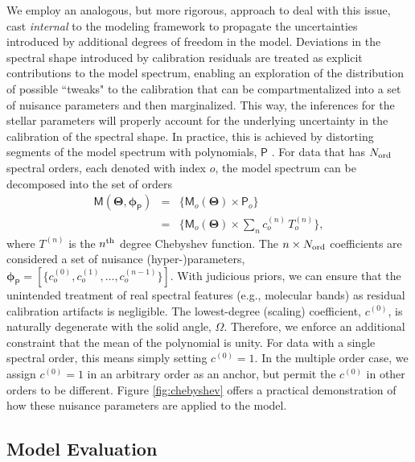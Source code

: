 \documentclass[iop,floatfix,twocolappendix]{emulateapj}
\newcommand{\vM}{\mathsf{M}}
\newcommand{\vT}{ {\bm \Theta}}
\newcommand{\vp}{ {\bm \phi}}
\newcommand{\cheb}{ \vp_{\mathsf{P}}}
\begin{document}
We employ an analogous, but more rigorous, approach to deal with this issue, cast {\it internal} to 
the modeling framework to propagate the uncertainties introduced by additional degrees of freedom 
in the model.  Deviations in the spectral shape introduced by calibration residuals are treated as 
explicit contributions to the model spectrum, enabling an exploration of the distribution of 
possible ``tweaks" to the calibration that can be compartmentalized into a set of nuisance 
parameters and then marginalized.  This way, the inferences for the stellar parameters will 
properly account for the underlying uncertainty in the calibration of the spectral shape.  In 
practice, this is achieved by distorting segments of the model spectrum with polynomials, 
$\mathsf{P}$ \citep[e.g.,][]{eisenstein06,koleva09}.  For data that has $N_{\rm ord}$ spectral 
orders, each denoted with index $o$, the model spectrum can be decomposed into the set of orders
\begin{eqnarray} \label{eqn:chebyshev}
\vM(\vT, \cheb) &=& \{ \vM_o(\vT) \times \mathsf{P}_o \} \\
                &=& \{ \vM_o(\vT) \times \sum_n c_o^{(n)} \, T_o^{(n)} \}, \nonumber
\end{eqnarray}
where $T^{(n)}$ is the $n^{\rm th}$ degree Chebyshev function.  The $n \times N_{\rm ord}$ 
coefficients are considered a set of nuisance (hyper-)parameters, $\cheb = [\{c_o^{(0)}, c_o^{(1)}, 
\ldots, c_o^{(n-1)} \}]$.  With judicious priors, we can ensure that the unintended treatment of 
real spectral features (e.g., molecular bands) as residual calibration artifacts is negligible.  
The lowest-degree (scaling) coefficient, $c^{(0)}$, is naturally degenerate with the solid angle, 
$\Omega$.  Therefore, we enforce an additional constraint that the mean of the polynomial is 
unity.  For data with a single spectral order, this means simply setting $c^{(0)} = 1$.  In the 
multiple order case, we assign $c^{(0)} = 1$ in an arbitrary order as an anchor, but permit the 
$c^{(0)}$ in other orders to be different.  Figure \ref{fig:chebyshev} offers a practical 
demonstration of how these nuisance parameters are applied to the model. 


\subsection{Model Evaluation} \label{subsec:likelihood}
\end{document}
